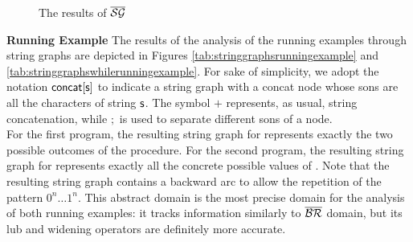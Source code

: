 \documentclass[orivec]{llncs}
\begin{document}
\begin{figure}[t]
\begin{center}
{}
\end{center}
\caption{The results of $\mathsf{\overline{\mathsf{\mathcal{SG}}}}$}
\end{figure}

 
\noindent \textbf{Running Example} The results of the analysis of the running examples through string graphs are depicted in Figures \ref{tab:stringgraphsrunningexample} and \ref{tab:stringgraphswhilerunningexample}. For sake of simplicity, we adopt the notation $\mathsf{concat}[\mathsf{s}]$ to indicate a string graph with a concat node whose sons are all the characters of string $\mathsf{s}$. The symbol $+$ represents, as usual, string concatenation, while $;$ is used to separate different sons of a node. \\
For the first program, the resulting string graph for  represents exactly the two possible outcomes of the procedure. For the second program, the resulting string graph for  represents exactly all the concrete possible values of . Note that the resulting string graph contains a backward arc to allow the repetition of the pattern $0^n \dots 1^n$. This abstract domain is the most precise domain for the analysis of both running examples: it tracks information similarly to $\mathsf{\overline{\mathsf{\mathcal{BR}}}}$ domain, but its lub and widening operators are definitely more accurate.
\end{document}
